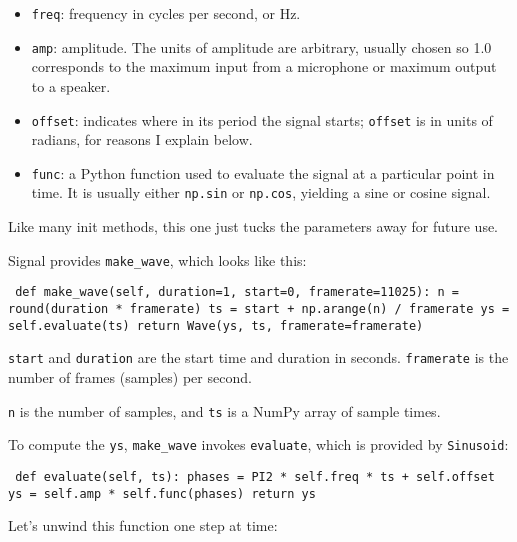 \documentclass[12pt]{book} \usepackage[width=5.5in,height=8.5in, hmarginratio=3:2,vmarginratio=1:1]{geometry}
\begin{document}
\begin{itemize} 

\item {\tt freq}: frequency in cycles per second, or Hz. 

\item {\tt amp}: amplitude. The units of amplitude are arbitrary, usually chosen so 1.0 corresponds to the maximum input from a microphone or maximum output to a speaker. 

\item {\tt offset}: indicates where in its period the signal starts; {\tt offset} is in units of radians, for reasons I explain below. 

\item {\tt func}: a Python function used to evaluate the signal at a particular point in time. It is usually either {\tt np.sin} or {\tt np.cos}, yielding a sine or cosine signal. 

\end{itemize} 

Like many init methods, this one just tucks the parameters away for future use. 

Signal provides \verb"make_wave", which looks like this: 

\begin{verbatim} def make_wave(self, duration=1, start=0, framerate=11025): n = round(duration * framerate) ts = start + np.arange(n) / framerate ys = self.evaluate(ts) return Wave(ys, ts, framerate=framerate) \end{verbatim} 

{\tt start} and {\tt duration} are the start time and duration in seconds. {\tt framerate} is the number of frames (samples) per second. 

{\tt n} is the number of samples, and {\tt ts} is a NumPy array of sample times. 

To compute the {\tt ys}, \verb"make_wave" invokes {\tt evaluate}, which is provided by {\tt Sinusoid}: 

\begin{verbatim} def evaluate(self, ts): phases = PI2 * self.freq * ts + self.offset ys = self.amp * self.func(phases) return ys \end{verbatim} 

Let's unwind this function one step at time: 
\end{document}
